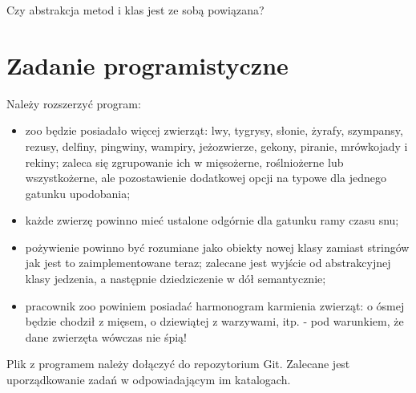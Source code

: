 \documentclass{article}
\begin{document}
	Czy abstrakcja metod i klas jest ze sobą powiązana?

	\section{Zadanie programistyczne}
	Należy rozszerzyć program:
	
	\begin{itemize}
		\item zoo będzie posiadało więcej zwierząt: lwy, tygrysy, słonie, żyrafy, szympansy, rezusy, delfiny, pingwiny, wampiry, jeżozwierze, gekony, piranie, mrówkojady i rekiny; zaleca się zgrupowanie ich w mięsożerne, roślniożerne lub wszystkożerne, ale pozostawienie dodatkowej opcji na typowe dla jednego gatunku upodobania;
		\item każde zwierzę powinno mieć ustalone odgórnie dla gatunku ramy czasu snu;
		\item pożywienie powinno być rozumiane jako obiekty nowej klasy zamiast stringów jak jest to zaimplementowane teraz; zalecane jest wyjście od abstrakcyjnej klasy jedzenia, a następnie dziedziczenie w dół semantycznie;
		\item pracownik zoo powiniem posiadać harmonogram karmienia zwierząt: o ósmej będzie chodził z mięsem, o dziewiątej z warzywami, itp. - pod warunkiem, że dane zwierzęta wówczas nie śpią!
	\end{itemize}
	
	Plik z programem należy dołączyć do repozytorium Git. Zalecane jest uporządkowanie zadań w odpowiadającym im katalogach.
\end{document}
